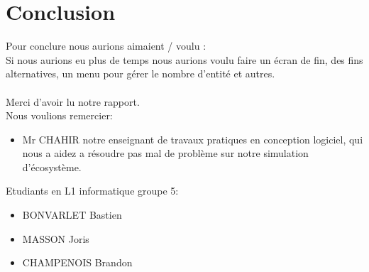 \documentclass[a4paper, 11pt]{article}
\begin{document}
\newpage

\section{Conclusion}

Pour conclure nous aurions aimaient / voulu :\\
Si nous aurions eu plus de temps nous aurions voulu faire un écran de fin, des fins alternatives, un menu pour gérer le nombre d'entité et autres.\\
\\
Merci d'avoir lu notre rapport.\\
Nous voulions remercier:\\
\begin{itemize}
\item Mr CHAHIR notre enseignant de travaux pratiques en conception logiciel, qui nous a aidez a résoudre pas mal de problème sur notre simulation d'écosystème.
\end{itemize}

\vspace{1cm}

Etudiants en L1 informatique groupe 5:\\
\begin{itemize}
\item BONVARLET Bastien\\
\item MASSON Joris\\
\item CHAMPENOIS Brandon\\
\end{itemize}

\newpage
\end{document}
